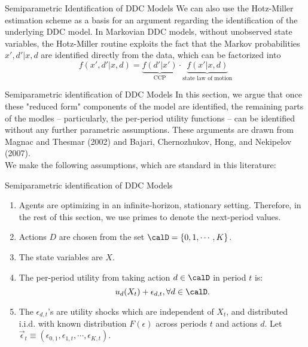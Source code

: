 \begin{frame}{Semiparametric Identification of DDC Models}
\vspace{3mm}
We can also use the Hotz-Miller estimation scheme as a basis for an argument regarding the identification of the underlying DDC model. In Markovian DDC models, without unobserved state variables, the Hotz-Miller routine exploits the fact that the Markov probabilities $x', d'|x, d$ are identified directly from the data, which can be factorized into
\begin{equation}
f(x',d'|x,d) = \underbrace{f(d'|x')}_{\text{CCP}} \cdot \underbrace{f(x'|x,d)}_{\text{state law of motion}}
\end{equation}
\end{frame}

\begin{frame}{Semiparametric identification of DDC Models}
In this section, we argue that once these "reduced form" components of the model are identified, the remaining parts of the modles -- particularly, the per-period utility functions -- can be identified without any further parametric assumptions. These arguments are drawn from Magnac and Thesmar (2002) and Bajari, Chernozhukov, Hong, and Nekipelov (2007).\\
We make the following assumptions, which are standard in this literature:
\end{frame}

\begin{frame}{Semiparametric identification of DDC Models}
\begin{enumerate}
\item Agents are optimizing in an infinite-horizon, stationary setting. Therefore, in the rest of this section, we use primes to denote the next-period values. 
\item Actions $D$ are chosen from the set $\calD = \{0,1, \cdots, K\}$.
\item The state variables are $X$.
\item The per-period utility from taking action $d \in \calD$ in period $t$ is:
\begin{equation*}
u_d(X_t) +\epsilon_{d,t}, \forall d \in \calD.
\end{equation*}
\item The $\epsilon_{d,t}$'s are utility shocks which are independent of $X_t$, and distributed i.i.d. with known distribution $F(\epsilon)$ across periods $t$ and actions $d$. Let $\vec \epsilon_t \equiv (\epsilon_{0,1}, \epsilon_{1,t}, \cdots, \epsilon_{K,t}).$ \\
\end{enumerate}
\end{frame}

